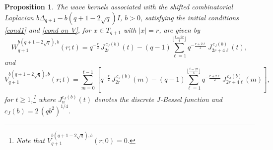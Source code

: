 \documentclass[12pt]{amsart}
\numberwithin{equation}{section}
\newtheorem{proposition}[theorem]{Proposition}
\theoremstyle{boldremark}
\begin{document}
\begin{proposition}\label{prop:boundary}
The wave kernels associated with the shifted combinatorial Laplacian $b\Delta_{q+1}-b(q+1-2\sqrt q)I$, $b>0$, satisfying the initial conditions \eqref{cond1} and \eqref{cond on V}, for $x\in T_{q+1}$ with $|x|=r$, are given by
\begin{equation}\label{eq:J-form}
W^{b(q+1-2\sqrt{q}),b}_{q+1}(r;t)
=
q^{-\tfrac{r}{2}}\,J_{2r}^{\,c_J(b)}(t)
-(q-1)\sum_{\ell=1}^{\lfloor \tfrac{t-2r}{4}\rfloor}q^{-\tfrac{r+2\ell}{2}}\,J_{2r+4\ell}^{\,c_J(b)}(t),
\end{equation}
and
\begin{equation}\label{eq:J-form2}
V^{b(q+1-2\sqrt{q}),b}_{q+1}(r;t)
= \sum_{m=0}^{t-1}\left[
q^{-\tfrac{r}{2}}\,J_{2r}^{\,c_J(b)}(m)
-(q-1)\sum_{\ell=1}^{\lfloor \tfrac{t-2r}{4}\rfloor}q^{-\tfrac{r+2\ell}{2}}\,J_{2r+4\ell}^{\,c_J(b)}(m)\right],
\end{equation}
for $t\geq 1$,\footnote{Note that $V^{b(q+1-2\sqrt{q}),b}_{q+1}(r;0)=0$.} where $J_{n}^{c_J(b)}(t)$ denotes the discrete $J$-Bessel function and $c_J(b)=2\,(qb^2)^{1/4}$.
\end{proposition}
\end{document}

